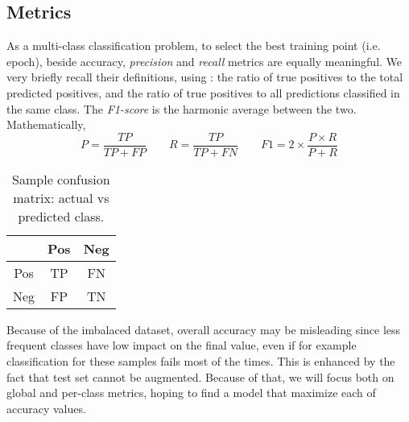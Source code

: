 \subsection{Metrics}\label{ssec:metrics}

As a multi-class classification problem, to select the best training point (i.e. epoch), beside accuracy, \textit{precision} and \textit{recall} metrics are equally meaningful.
We very briefly recall their definitions, using : the ratio of true positives to the total predicted positives, and the ratio of true positives to all predictions classified in the same class.
The \textit{F1-score} is the harmonic average between the two.
Mathematically,
\[ P = \frac{TP}{TP+FP} \qquad R = \frac{TP}{TP+FN} \qquad F1 = 2 \times \frac{P\times R}{P+R} \]

\begin{table}[ht]
    \centering
    \caption{Sample confusion matrix: actual vs predicted class.}
    \label{tab:class_mat}
    \begin{tabular}{c|cc}\toprule
        & Pos & Neg \\\midrule
    Pos & TP  & FN  \\
    Neg & FP  & TN  \\\bottomrule
    \end{tabular}
\end{table}


Because of the imbalaced dataset, overall accuracy may be misleading since less frequent classes have low impact on the final value, even if for example classification for these samples fails most of the times.
This is enhanced by the fact that test set cannot be augmented.
Because of that, we will focus both on global and per-class metrics, hoping to find a model that maximize each of accuracy values. %

